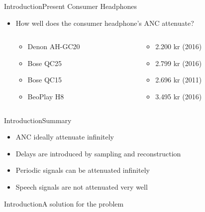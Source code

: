\begin{frame}{Introduction}{Present Consumer Headphones}
	\begin{itemize}	
	\item How well does the consumer headphone's ANC attenuate?
	\begin{columns}
		\begin{column}{0.27\textwidth}
		\begin{itemize}
			\item Denon AH-GC20
			\item Bose QC25 
			\item Bose QC15 	
			\item BeoPlay H8 	
		\end{itemize}
		\end{column}
		\begin{column}{0.6\textwidth} 
		\begin{itemize}
			\item[] 2.200 kr (2016)
			\item[] 2.799 kr (2016)
			\item[] 2.696 kr (2011)
			\item[] 3.495 kr (2016)
		\end{itemize}
		\end{column}
	\end{columns}
	\end{itemize}			
	\begin{center}
		
	\end{center}	
\end{frame}

\begin{frame}{Introduction}{Summary}		
	\begin{itemize}
		\item ANC ideally attenuate infinitely 
		\item Delays are introduced by sampling and reconstruction
		\item Periodic signals can be attenuated infinitely
		\item Speech signals are not attenuated very well
	\end{itemize}
\end{frame}


\begin{frame}{Introduction}{A solution for the problem}		
\end{frame}


